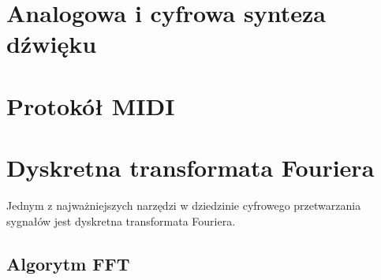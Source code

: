 \section{Analogowa i cyfrowa synteza dźwięku}

\section{Protokół MIDI}

\section{Dyskretna transformata Fouriera}
Jednym z najważniejszych narzędzi w dziedzinie cyfrowego przetwarzania sygnałów jest dyskretna transformata Fouriera. 
\subsection{Algorytm FFT}

